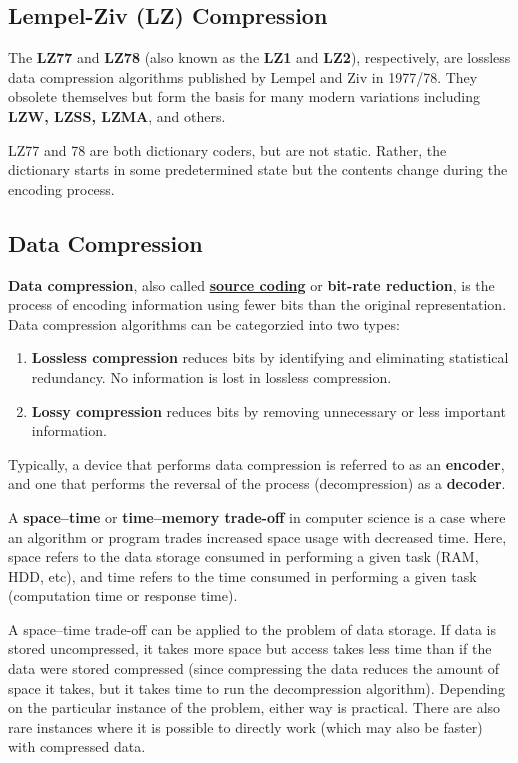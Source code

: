  \subsection{Lempel-Ziv (LZ) Compression}

    The \textbf{LZ77} and \textbf{LZ78} (also known as the \textbf{LZ1} and \textbf{LZ2}), respectively, are lossless data compression algorithms published by Lempel and Ziv in 1977/78. They obsolete themselves but form the basis for many modern variations including \textbf{LZW, LZSS, LZMA}, and others. 

    LZ77 and 78 are both dictionary coders, but are not static. Rather, the dictionary starts in some predetermined state but the contents change during the encoding process. 


  \subsection{Data Compression}

    \textbf{Data compression}, also called \textbf{\hyperref[thm:source-coding-theorem]{source coding}} or  \textbf{bit-rate reduction}, is the process of encoding information using fewer bits than the original representation. Data compression algorithms can be categorzied into two types: 
    \begin{enumerate}
        \item \textbf{Lossless compression} reduces bits by identifying and eliminating statistical redundancy. No information is lost in lossless compression. 
        \item \textbf{Lossy compression} reduces bits by removing unnecessary or less important information.
    \end{enumerate}
    Typically, a device that performs data compression is referred to as an \textbf{encoder}, and one that performs the reversal of the process (decompression) as a \textbf{decoder}. 

    A \textbf{space–time} or \textbf{time–memory trade-off} in computer science is a case where an algorithm or program trades increased space usage with decreased time. Here, space refers to the data storage consumed in performing a given task (RAM, HDD, etc), and time refers to the time consumed in performing a given task (computation time or response time). 

    A space–time trade-off can be applied to the problem of data storage. If data is stored uncompressed, it takes more space but access takes less time than if the data were stored compressed (since compressing the data reduces the amount of space it takes, but it takes time to run the decompression algorithm). Depending on the particular instance of the problem, either way is practical. There are also rare instances where it is possible to directly work (which may also be faster) with compressed data. 

